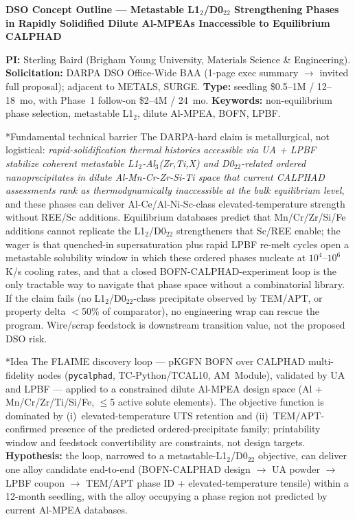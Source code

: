 \documentclass[10pt]{article}
\makeatletter
\renewcommand{\section}{\@startsection{section}{1}{0pt}{0.4ex plus 0.1ex}{0.15ex}{\normalfont\bfseries}}
\makeatother
\begin{document}
\small

\begin{center}
{\bfseries DSO Concept Outline --- Metastable L1$_2$/D0$_{22}$ Strengthening Phases in Rapidly Solidified Dilute Al-MPEAs Inaccessible to Equilibrium CALPHAD}
\end{center}

{\small \textbf{PI:} Sterling Baird (Brigham Young University, Materials Science \& Engineering). \textbf{Solicitation:} DARPA DSO Office-Wide BAA (1-page exec summary $\to$ invited full proposal); adjacent to METALS, SURGE. \textbf{Type:} seedling \$0.5--1M / 12--18~mo, with Phase~1 follow-on \$2--4M / 24~mo. \textbf{Keywords:} non-equilibrium phase selection, metastable L1$_2$, dilute Al-MPEA, BOFN, LPBF.}



\section*{Fundamental technical barrier}
The DARPA-hard claim is metallurgical, not logistical: \emph{rapid-solidification thermal histories accessible via UA + LPBF stabilize coherent metastable L1$_2$-Al$_3$(Zr,Ti,X) and D0$_{22}$-related ordered nanoprecipitates in dilute Al-Mn-Cr-Zr-Si-Ti space that current CALPHAD assessments rank as thermodynamically inaccessible at the bulk equilibrium level}, and these phases can deliver Al-Ce/Al-Ni-Sc-class elevated-temperature strength without REE/Sc additions. Equilibrium databases predict that Mn/Cr/Zr/Si/Fe additions cannot replicate the L1$_2$/D0$_{22}$ strengtheners that Sc/REE enable; the wager is that quenched-in supersaturation plus rapid LPBF re-melt cycles open a metastable solubility window in which these ordered phases nucleate at $10^4$--$10^6$ K/s cooling rates, and that a closed BOFN-CALPHAD-experiment loop is the only tractable way to navigate that phase space without a combinatorial library. If the claim fails (no L1$_2$/D0$_{22}$-class precipitate observed by TEM/APT, or property delta $< $50\% of comparator), no engineering wrap can rescue the program. Wire/scrap feedstock is downstream transition value, not the proposed DSO risk.

\section*{Idea}
The FLAIME discovery loop --- pKGFN BOFN over CALPHAD multi-fidelity nodes (\texttt{pycalphad}, TC-Python/TCAL10, AM~Module), validated by UA and LPBF --- applied to a constrained dilute Al-MPEA design space (Al + Mn/Cr/Zr/Ti/Si/Fe, $\le$5 active solute elements). The objective function is dominated by (i)~elevated-temperature UTS retention and (ii)~TEM/APT-confirmed presence of the predicted ordered-precipitate family; printability window and feedstock convertibility are constraints, not design targets. \textbf{Hypothesis:} the loop, narrowed to a metastable-L1$_2$/D0$_{22}$ objective, can deliver one alloy candidate end-to-end (BOFN-CALPHAD design $\to$ UA powder $\to$ LPBF coupon $\to$ TEM/APT phase ID + elevated-temperature tensile) within a 12-month seedling, with the alloy occupying a phase region not predicted by current Al-MPEA databases.
\end{document}

